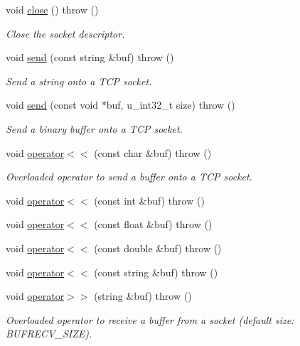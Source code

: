 \begin{CompactItemize}
void \hyperlink{classSocket_75ee749264ccbcfc4dfbf5442e55dcb8}{close} ()  throw ()
\begin{CompactList}\small\item\em Close the socket descriptor. \item\end{CompactList}\item 
void \hyperlink{classSocket_58193259e85351165b60e6cad9e8e1ac}{send} (const string \&buf)  throw ()
\begin{CompactList}\small\item\em Send a string onto a TCP socket. \item\end{CompactList}\item 
void \hyperlink{classSocket_e19472a87361143b4e3e2730e69b5955}{send} (const void $\ast$buf, u\_\-int32\_\-t size)  throw ()
\begin{CompactList}\small\item\em Send a binary buffer onto a TCP socket. \item\end{CompactList}\item 
void \hyperlink{classSocket_0980ddfd4e759553b20e5e517f2f9fc2}{operator$<$$<$} (const char \&buf)  throw ()
\begin{CompactList}\small\item\em Overloaded operator to send a buffer onto a TCP socket. \item\end{CompactList}\item 
void \hyperlink{classSocket_517cbbbff8acd1aff6d8175559bc531f}{operator$<$$<$} (const int \&buf)  throw ()
\item 
void \hyperlink{classSocket_6ea159d9fa113f2e9f5a01f2e29fb295}{operator$<$$<$} (const float \&buf)  throw ()
\item 
void \hyperlink{classSocket_41b423cfc8d93f8a66de428f8699cdd7}{operator$<$$<$} (const double \&buf)  throw ()
\item 
void \hyperlink{classSocket_007dc764a2d2bfb7b38fef1f9b7a9a91}{operator$<$$<$} (const string \&buf)  throw ()
\item 
void \hyperlink{classSocket_fa79720d97b16058c2ce8dad82256ce2}{operator$>$$>$} (string \&buf)  throw ()
\begin{CompactList}\small\item\em Overloaded operator to receive a buffer from a socket (default size: BUFRECV\_\-SIZE). \item\end{CompactList}\item 

\end{CompactItemize}
